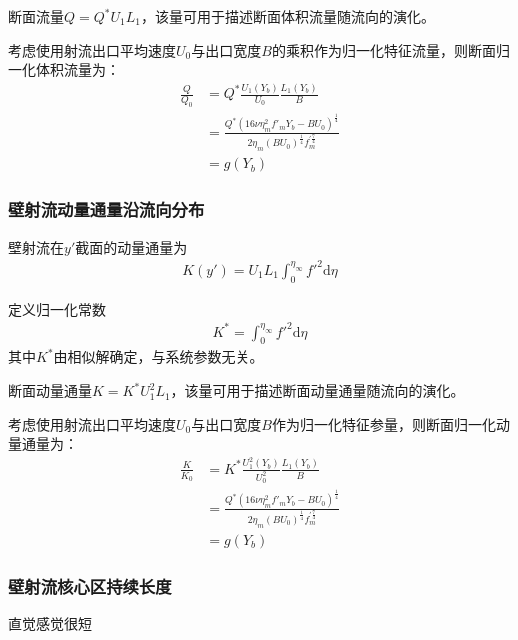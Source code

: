 断面流量$Q=Q^{*}U_{1}L_{1}$，该量可用于描述断面体积流量随流向的演化。

考虑使用射流出口平均速度$U_{0}$与出口宽度$B$的乘积作为归一化特征流量，则断面归一化体积流量为：
\begin{align}
    \frac{Q}{Q_{0}}&=Q^{*}\frac{U_{1}(Y_{b})}{U_{0}}\frac{L_{1}(Y_{b})}{B}\\
    &=\frac{Q^{*}(16\nu\eta_{m}^{2}f'_{m}Y_{b}-BU_{0})^{\frac{1}{4}}}{2\eta_{m}(BU_{0})^{\frac{1}{4}}f_{m}^{'\frac{7}{4}}}\\
    &=g(Y_{b})
\end{align}

\subsubsection{壁射流动量通量沿流向分布}
壁射流在$y'$截面的动量通量为
\begin{align*}
    K(y')=U_{1}L_{1}\int_{0}^{\eta_{\infty}}f'^{2}\mathrm{d}\eta
\end{align*}

定义归一化常数
\begin{align*}
    K^{*}=\int_{0}^{\eta_{\infty}}f'^{2}\mathrm{d}\eta
\end{align*}
其中$K^{*}$由相似解确定，与系统参数无关。

断面动量通量$K=K^{*}U_{1}^{2}L_{1}$，该量可用于描述断面动量通量随流向的演化。

考虑使用射流出口平均速度$U_{0}$与出口宽度$B$作为归一化特征参量，则断面归一化动量通量为：
\begin{align}
    \frac{K}{K_{0}}&=K^{*}\frac{U_{1}^{2}(Y_{b})}{U_{0}^{2}}\frac{L_{1}(Y_{b})}{B}\\
    &=\frac{Q^{*}(16\nu\eta_{m}^{2}f'_{m}Y_{b}-BU_{0})^{\frac{1}{4}}}{2\eta_{m}(BU_{0})^{\frac{1}{4}}f_{m}^{'\frac{7}{4}}}\\
    &=g(Y_{b})
\end{align}

\subsubsection{壁射流核心区持续长度}
直觉感觉很短

